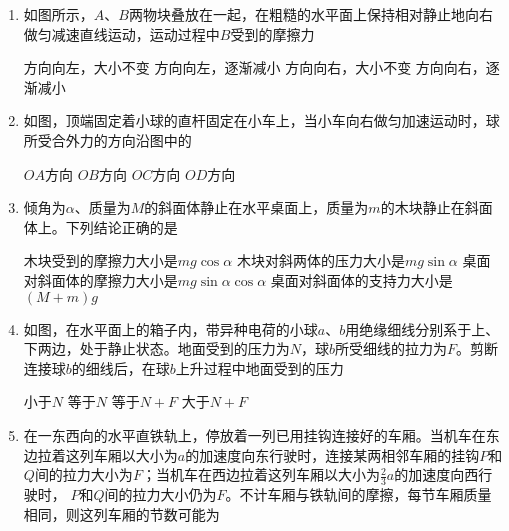 \begin{enumerate}[leftmargin=0em]
\item 
{}
如图所示，$ A $、$ B $两物块叠放在一起，在粗糙的水平面上保持相对静止地向右做匀减速直线运动，运动过程中$ B $受到的摩擦力 
\begin{figure}[h!]
\centering

\end{figure}

\fourchoices
{方向向左，大小不变 }
{方向向左，逐渐减小}
{方向向右，大小不变 }
{方向向右，逐渐减小}



\item 
{}
如图，顶端固定着小球的直杆固定在小车上，当小车向右做匀加速运动时，球所受合外力的方向沿图中的 
\begin{figure}[h!]
\centering

\end{figure}


\fourchoices
{$ OA $方向}
{$ OB $方向}
{$ OC $方向}
{$ OD $方向}





\item 
{}
倾角为$ \alpha $、质量为$ M $的斜面体静止在水平桌面上，质量为$ m $的木块静止在斜面体上。下列结论正确的是 
\begin{figure}[h!]
\centering

\end{figure}

\fourchoices
{木块受到的摩擦力大小是$ mg \cos \alpha $}
{木块对斜两体的压力大小是$ mg \sin \alpha $}
{桌面对斜面体的摩擦力大小是$ mg \sin \alpha \cos \alpha $}
{桌面对斜面体的支持力大小是$ (M+m)g $}

\newpage
\item 
{}
如图，在水平面上的箱子内，带异种电荷的小球$ a $、$ b $用绝缘细线分别系于上、下两边，处于静止状态。地面受到的压力为$ N $，球$ b $所受细线的拉力为$ F $。剪断连接球$ b $的细线后，在球$ b $上升过程中地面受到的压力 
\begin{figure}[h!]
\centering

\end{figure}

\fourchoices
{小于$ N $ }
{等于$ N $}
{等于$ N+F $ }
{大于$ N+F $}


\item
{}
在一东西向的水平直铁轨上，停放着一列已用挂钩连接好的车厢。当机车在东边拉着这列车厢以大小为$ a $的加速度向东行驶时，连接某两相邻车厢的挂钩$ P $和$ Q $间的拉力大小为$ F $；当机车在西边拉着这列车厢以大小为$ \frac{ 2 }{ 3 } a $的加速度向西行驶时， $ P $和$ Q $间的拉力大小仍为$ F $。不计车厢与铁轨间的摩擦，每节车厢质量相同，则这列车厢的节数可能为 


\end{enumerate}
